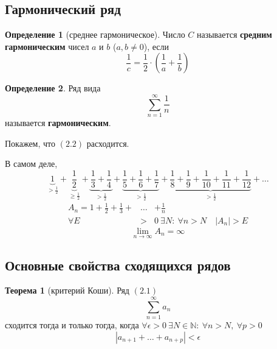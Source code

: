 \documentclass{report}
\theoremstyle{definition}
\newtheorem{definition}{Определение}[section]
\newtheorem{theorem}{Теорема}[section]
\begin{document}
\subsection{Гармонический ряд}

\begin{definition}[среднее гармоническое]
  Число $C$ называется \textbf{средним гармоническим} чисел $a$ и $b$ ($a,b \ne 0$), если
  \begin{equation*}
    \frac{1}{c} = \frac{1}{2}\cdot (\frac{1}{a} + \frac{1}{b})
  \end{equation*}
\end{definition}

\begin{definition}
  Ряд вида
  \begin{equation}
    \sum_{n=1}^{\infty}\frac{1}{n}
  \end{equation}
  называется \textbf{гармоническим}.

  Покажем, что $(2.2)$ расходится.

  В самом деле,
  \begin{equation*}
    \underbrace{1}_{>\frac{1}{2}} + \underbrace{\frac{1}{2}}_{\geqslant \frac{1}{2}} + \underbrace{\frac{1}{3} + \frac{1}{4}}_{> \frac{1}{2}} + \underbrace{\frac{1}{5} + \frac{1}{6} + \frac{1}{7}}_{> \frac{1}{2}} + \underbrace{\frac{1}{8} + \frac{1}{9} + \frac{1}{10} + \frac{1}{11} + \frac{1}{12}}_{> \frac{1}{2}} + \ldots
  \end{equation*}
  \begin{eqnarray*}
    A_n = 1 + \frac{1}{2} + \frac{1}{3} + &\ldots& + \frac{1}{n} \\
    \forall E &>& 0 \ \exists N : \ \forall n > N \quad |A_n| > E
  \end{eqnarray*}
  \begin{equation*}
    \underset{n\rightarrow\infty}{\lim}A_n = \infty
  \end{equation*}
\end{definition}

\subsection{Основные свойства сходящихся рядов}

\begin{theorem}[критерий Коши]
  Ряд $(2.1)$
  \begin{equation*}
    \sum_{n=1}^{\infty}a_n
  \end{equation*}
  сходится тогда и только тогда, когда $\forall \epsilon > 0 \ \exists N \in \mathbb{N}: \ \forall n > N, \ \forall p > 0$
  \begin{equation*}
    |a_{n+1} + \ldots + a_{n+p}| < \epsilon
  \end{equation*}
\end{theorem}
\end{document}

